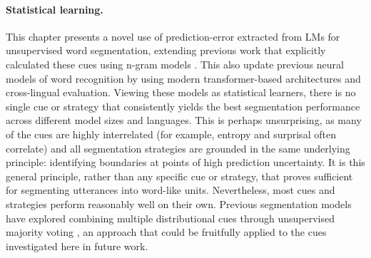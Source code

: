 
\paragraph{Statistical learning.} This chapter presents a novel use of prediction-error extracted from LMs for unsupervised word segmentation, extending previous work that explicitly calculated these cues using n-gram models \citep{ccoltekin2014explicit, Coltekin2017, goriely2023word}. This also update previous neural models of word recognition \citep{elman1990finding, christiansen1998learning} by using modern transformer-based architectures and cross-lingual evaluation. Viewing these models as statistical learners, there is no single cue or strategy that consistently yields the best segmentation performance across different model sizes and languages. This is perhaps unsurprising, as many of the cues are highly interrelated (for example, entropy and surprisal often correlate) and all segmentation strategies are grounded in the same underlying principle: identifying boundaries at points of high prediction uncertainty. It is this general principle, rather than any specific cue or strategy, that proves sufficient for segmenting utterances into word-like units. Nevertheless, most cues and strategies perform reasonably well on their own. Previous segmentation models have explored combining multiple distributional cues through unsupervised majority voting \citep{Coltekin2017, goriely2023word}, an approach that could be fruitfully applied to the cues investigated here in future work.

